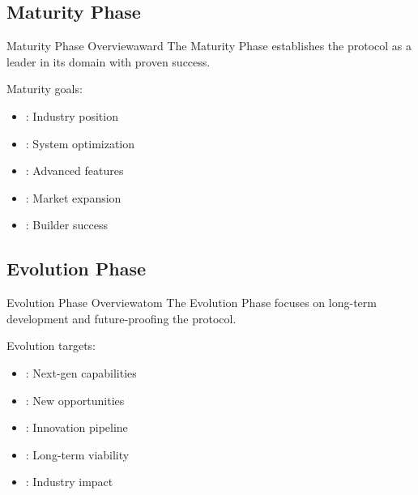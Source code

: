 \subsection{Maturity Phase}

\begin{mfai-box-prove}{Maturity Phase Overview}{award}
The Maturity Phase establishes the protocol as a leader in its domain with proven success.
\end{mfai-box-prove}

Maturity goals:

\begin{itemize}[leftmargin=*]
\item {}: Industry position
\item {}: System optimization
\item {}: Advanced features
\item {}: Market expansion
\item {}: Builder success
\end{itemize}

\subsection{Evolution Phase}

\begin{mfai-box-activate}{Evolution Phase Overview}{atom}
The Evolution Phase focuses on long-term development and future-proofing the protocol.
\end{mfai-box-activate}

Evolution targets:

\begin{itemize}[leftmargin=*]
\item {}: Next-gen capabilities
\item {}: New opportunities
\item {}: Innovation pipeline
\item {}: Long-term viability
\item {}: Industry impact
\end{itemize}

